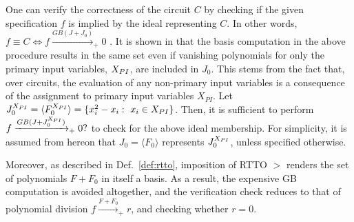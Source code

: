 One can verify the correctness of the circuit $C$ by checking
if the given specification $f$ is implied by the ideal representing 
$C$. In other words, $f \equiv C \iff f\xrightarrow{GB(J+J_0)}_+0$
\cite{lv:tcad2013}. 
It is shown in \cite{lv:tcad2013} that the \Grobner basis computation in the above procedure
results in the same set even if vanishing polynomials for only
the primary input variables, $X_{PI}$, are included in $J_0$. 
This stems from the fact that, over circuits, the evaluation of any non-primary input variables 
is a consequence of the assignment to primary input variables $X_{PI}$.
Let ${J_0^{X_{PI}}} = \langle F_0^{X_{PI}} \rangle = \{x_i^2-x_i:~x_i \in X_{PI}\}$.
Then, it is sufficient to perform $f \xrightarrow{GB(J+{J_0^{X_{PI}}})}_+0?$ to check for the above ideal membership.
For simplicity, it is assumed from hereon that $J_0 = \langle F_0\rangle$ 
represents ${J_0^{X_{PI}}}$, unless specified otherwise.

Moreover, as described in Def.~\ref{def:rtto}, imposition of RTTO $>$ 
renders the set of polynomials $F + F_0$  in itself a \Grobner basis. 
As a result, the expensive GB computation is avoided altogether, and
the verification check reduces to that of polynomial division
$f\xrightarrow{F+F_{0}}_+r$, and checking whether $r=0$.





